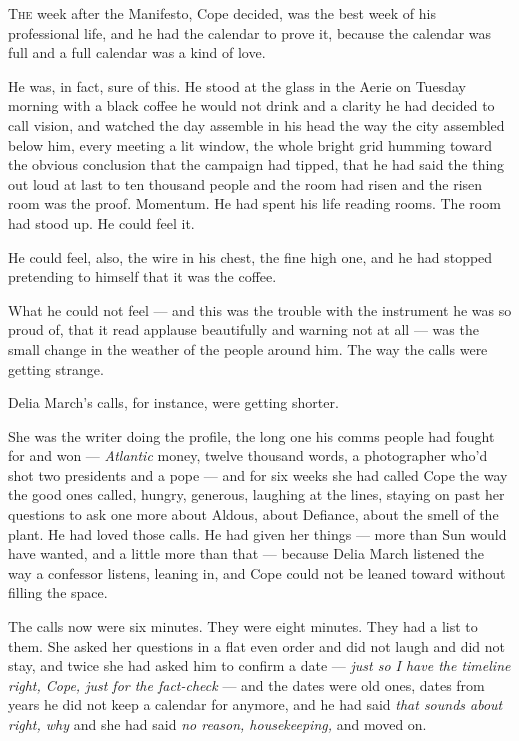\documentclass[11pt,openany]{book}
\begin{document}
\lettrine[lines=3, lhang=0.05, nindent=0.25em]{T}{he} week after the Manifesto, Cope decided, was the best week of his professional life, and he had the calendar to prove it, because the calendar was full and a full calendar was a kind of love.

He was, in fact, sure of this. He stood at the glass in the Aerie on Tuesday morning with a black coffee he would not drink and a clarity he had decided to call vision, and watched the day assemble in his head the way the city assembled below him, every meeting a lit window, the whole bright grid humming toward the obvious conclusion that the campaign had tipped, that he had said the thing out loud at last to ten thousand people and the room had risen and the risen room was the proof. Momentum. He had spent his life reading rooms. The room had stood up. He could feel it.

He could feel, also, the wire in his chest, the fine high one, and he had stopped pretending to himself that it was the coffee.

What he could not feel --- and this was the trouble with the instrument he was so proud of, that it read applause beautifully and warning not at all --- was the small change in the weather of the people around him. The way the calls were getting strange.

Delia March's calls, for instance, were getting shorter.

She was the writer doing the profile, the long one his comms people had fought for and won --- \textit{Atlantic} money, twelve thousand words, a photographer who'd shot two presidents and a pope --- and for six weeks she had called Cope the way the good ones called, hungry, generous, laughing at the lines, staying on past her questions to ask one more about Aldous, about Defiance, about the smell of the plant. He had loved those calls. He had given her things --- more than Sun would have wanted, and a little more than that --- because Delia March listened the way a confessor listens, leaning in, and Cope could not be leaned toward without filling the space.

The calls now were six minutes. They were eight minutes. They had a list to them. She asked her questions in a flat even order and did not laugh and did not stay, and twice she had asked him to confirm a date --- \textit{just so I have the timeline right, Cope, just for the fact-check} --- and the dates were old ones, dates from years he did not keep a calendar for anymore, and he had said \textit{that sounds about right, why} and she had said \textit{no reason, housekeeping,} and moved on.
\end{document}
